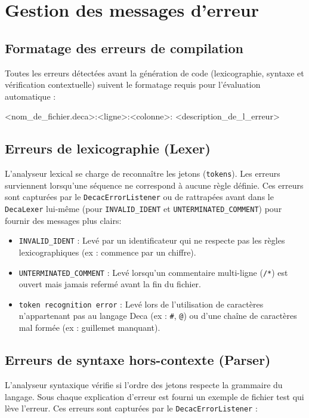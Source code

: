 \section{Gestion des messages d'erreur}
\subsection{Formatage des erreurs de compilation}
\noindent
Toutes les erreurs détectées avant la génération de code (lexicographie, syntaxe et vérification contextuelle) suivent le formatage requis pour l'évaluation automatique :

\begin{command}
<nom_de_fichier.deca>:<ligne>:<colonne>: <description_de_l_erreur>
\end{command}

\subsection{Erreurs de lexicographie (Lexer)}
\noindent
L'analyseur lexical se charge de reconnaître les jetons (\texttt{tokens}). Les erreurs surviennent lorsqu'une séquence ne correspond à aucune règle définie. Ces erreurs sont capturées par le \texttt{DecacErrorListener} ou de rattrapées avant dans le \texttt{DecaLexer} lui-même (pour \texttt{INVALID\_IDENT} et \texttt{UNTERMINATED\_COMMENT}) pour fournir des messages plus clairs:


\begin{itemize}[label=$\circ$]
    \item \texttt{INVALID\_IDENT} : Levé par un identificateur qui ne respecte pas les règles lexicographiques (ex : commence par un chiffre).
    \item \texttt{UNTERMINATED\_COMMENT} : Levé lorsqu'un commentaire multi-ligne (\texttt{/*}) est ouvert mais jamais refermé avant la fin du fichier.
    \item \texttt{token recognition error} : Levé lors de l'utilisation de caractères n'appartenant pas au langage Deca (ex : \texttt{\#}, \texttt{@}) ou d'une chaîne de caractères mal formée (ex : guillemet manquant).
\end{itemize}

\subsection{Erreurs de syntaxe hors-contexte (Parser)}
\noindent
L'analyseur syntaxique vérifie si l'ordre des jetons respecte la grammaire du langage. Sous chaque explication d'erreur est fourni un exemple de fichier test qui lève l'erreur. Ces erreurs sont capturées par le \texttt{DecacErrorListener} :

